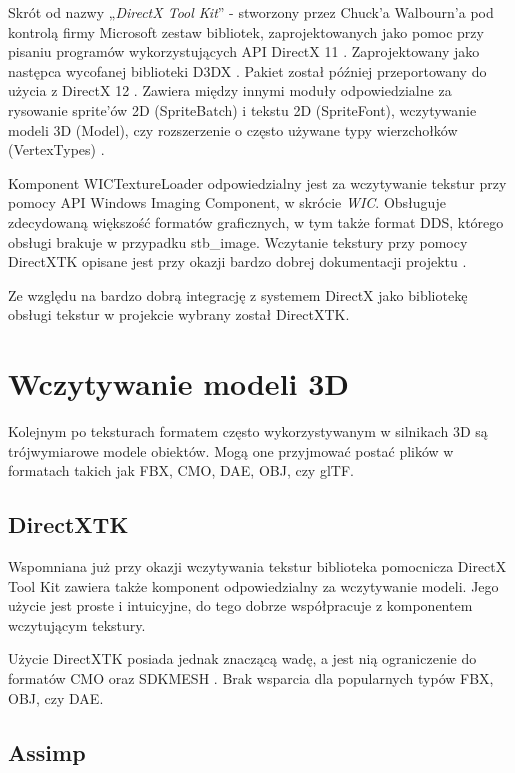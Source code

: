 Skrót od nazwy „\emph{DirectX Tool Kit}'' - stworzony przez Chuck'a
Walbourn'a pod kontrolą firmy Microsoft zestaw bibliotek,
zaprojektowanych jako pomoc przy pisaniu programów wykorzystujących API
DirectX 11 \cite{github:directxtk:2024}. Zaprojektowany jako następca wycofanej biblioteki
D3DX \cite{walbourn:directxtk:2024}. Pakiet został później przeportowany do użycia z DirectX
12 \cite{github:directxtk12:2024}. Zawiera między innymi moduły odpowiedzialne za rysowanie
sprite'ów 2D (SpriteBatch) i tekstu 2D (SpriteFont),
wczytywanie modeli 3D (Model), czy rozszerzenie o często używane typy
wierzchołków (VertexTypes) \cite{walbourn:directxtk:2024}.

Komponent WICTextureLoader odpowiedzialny jest za wczytywanie tekstur
przy pomocy API Windows Imaging Component, w skrócie \emph{WIC}. Obsługuje zdecydowaną większość formatów graficznych, w tym także format
DDS, którego obsługi brakuje w przypadku stb\_image. Wczytanie tekstury przy pomocy DirectXTK opisane jest przy okazji bardzo
dobrej dokumentacji projektu \cite{github:directxtk:sprites:2024}.

Ze względu na bardzo dobrą integrację z systemem DirectX jako bibliotekę
obsługi tekstur w projekcie wybrany został DirectXTK.

\section{Wczytywanie modeli 3D}

Kolejnym po teksturach formatem często wykorzystywanym w silnikach 3D są
trójwymiarowe modele obiektów. Mogą one przyjmować postać plików w
formatach takich jak FBX, CMO, DAE, OBJ, czy glTF.

\subsection{DirectXTK}

Wspomniana już przy okazji wczytywania tekstur biblioteka pomocnicza
DirectX Tool Kit zawiera także komponent odpowiedzialny za wczytywanie
modeli. Jego użycie jest proste i intuicyjne, do tego dobrze współpracuje z komponentem wczytującym tekstury.

Użycie DirectXTK posiada jednak znaczącą wadę, a jest nią ograniczenie
do formatów CMO oraz SDKMESH \cite{github:directxtk:model:2024}. Brak wsparcia dla popularnych
typów FBX, OBJ, czy DAE.

\subsection{Assimp}

